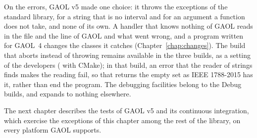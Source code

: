 \medskip
On the errors, GAOL v5 made one choice: it throws the exceptions of the
standard library,  for a string that is no
interval and  for an argument a function does not
take, and none of its own.\newinvfive{} A handler that knows nothing of GAOL
reads in  the file and the line of GAOL and what went wrong,
and a program written for GAOL~4 changes the classes it catches
(Chapter~\ref{chap:changes}). The build that aborts instead of throwing
remains available in the three builds, as a setting of the developers
( with CMake); in that build, an error that the reader of strings finds
makes the reading fail, so that 
returns the empty set as IEEE 1788-2015 has it, rather than end the program.
The debugging facilities belong to the Debug builds, and
 expands to nothing elsewhere.

\medskip
The next chapter describes the tests of GAOL v5 and its continuous
integration, which exercise the exceptions of this chapter among the rest of
the library, on every platform GAOL supports.
